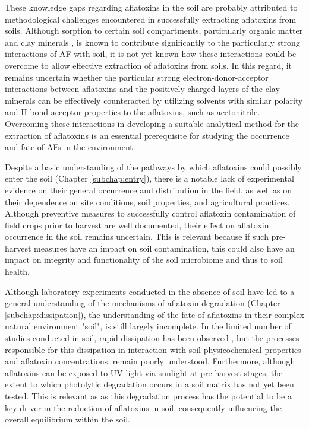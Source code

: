 These knowledge gaps regarding aflatoxins in the soil are probably attributed to methodological challenges encountered in successfully extracting aflatoxins from soils. Although sorption to certain soil compartments, particularly organic matter \citep{schenzel2012experimentally} and clay minerals \citep{kang2016understanding}, is known to contribute significantly to the particularly strong interactions of AF with soil, it is not yet known how these interactions could be overcome to allow effective extraction of aflatoxins from soils. In this regard, it remains uncertain whether the particular strong electron-donor-acceptor interactions between aflatoxins and the positively charged layers of the clay minerals can be effectively counteracted by utilizing solvents with similar polarity and H-bond acceptor properties to the aflatoxins, such as acetonitrile. Overcoming these interactions in developing a suitable analytical method for the extraction of aflatoxins is an essential prerequisite for studying the occurrence and fate of AFs in the environment.


Despite a basic understanding of the pathways by which aflatoxins could possibly enter the soil (Chapter \ref{subchap:entry}), there is a notable lack of experimental evidence on their general occurrence and distribution in the field, as well as on their dependence on site conditions, soil properties, and agricultural practices. Although preventive measures to successfully control aflatoxin contamination of field crops prior to harvest are well documented, their effect on aflatoxin occurrence in the soil remains uncertain. This is relevant because if such pre-harvest measures have an impact on soil contamination, this could also have an impact on integrity and functionality of the soil microbiome and thus to soil health.


Although laboratory experiments conducted in the absence of soil have led to a general understanding of the mechanisms of aflatoxin degradation (Chapter \ref{subchap:dissipation}), the understanding of the fate of aflatoxins in their complex natural environment "soil", is still largely incomplete. In the limited number of studies conducted in soil, rapid dissipation has been observed \citep{accinelli2008aspergillus, angle1980decomposition, angle1986aflatoxin}, but the processes responsible for this dissipation in interaction with soil physicochemical properties and aflatoxin concentrations, remain poorly understood. Furthermore, although aflatoxins can be exposed to UV light via sunlight at pre-harvest stages, the extent to which photolytic degradation occurs in a soil matrix has not yet been tested. This is relevant as as this degradation process has the potential to be a key driver in the reduction of aflatoxins in soil, consequently influencing the overall equilibrium within the soil.


